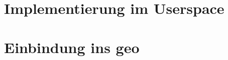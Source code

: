 \section{Implementierung im Userspace}\label{sec:user}


\section{Einbindung ins \acl{geo}}\label{sec:soft}












